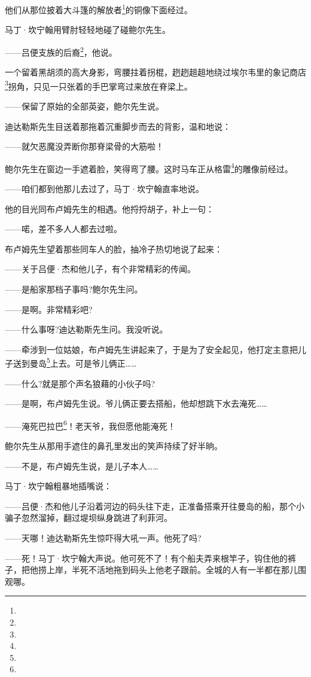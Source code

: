 \par 他们从那位披着大斗篷的解放者\footnote{}的铜像下面经过。
\par 马丁·坎宁翰用臂肘轻轻地碰了碰鲍尔先生。
\par ——吕便支族的后裔\footnote{}，他说。
\par 一个留着黑胡须的高大身影，弯腰拄着拐棍，趔趔趄趄地绕过埃尔韦里的象记商店\footnote{}拐角，只见一只张着的手巴掌弯过来放在脊梁上。
\par ——保留了原始的全部英姿，鲍尔先生说。
\par 迪达勒斯先生目送着那拖着沉重脚步而去的背影，温和地说：
\par ——就欠恶魔没弄断你那脊梁骨的大筋啦！
\par 鲍尔先生在窗边一手遮着脸，笑得弯了腰。这时马车正从格雷\footnote{}的雕像前经过。
\par ——咱们都到他那儿去过了，马丁·坎宁翰直率地说。
\par 他的目光同布卢姆先生的相遇。他捋捋胡子，补上一句：
\par ——喏，差不多人人都去过啦。
\par 布卢姆先生望着那些同车人的脸，抽冷子热切地说了起来：
\par ——关于吕便·杰和他儿子，有个非常精彩的传闻。
\par ——是船家那档子事吗?鲍尔先生问。
\par ——是啊。非常精彩吧?
\par ——什么事呀?迪达勒斯先生问。我没听说。
\par ——牵涉到一位姑娘，布卢姆先生讲起来了，于是为了安全起见，他打定主意把儿子送到曼岛\footnote{}上去。可是爷儿俩正……
\par ——什么?就是那个声名狼藉的小伙子吗?
\par ——是啊，布卢姆先生说。爷儿俩正要去搭船，他却想跳下水去淹死……
\par ——淹死巴拉巴\footnote{}！老天爷，我但愿他能淹死！
\par 鲍尔先生从那用手遮住的鼻孔里发出的笑声持续了好半晌。
\par ——不是，布卢姆先生说，是儿子本人……
\par 马丁·坎宁翰粗暴地插嘴说：
\par ——吕便·杰和他儿子沿着河边的码头往下走，正准备搭乘开往曼岛的船，那个小骗子忽然溜掉，翻过堤坝纵身跳进了利菲河。
\par ——天哪！迪达勒斯先生惊吓得大吼一声。他死了吗?
\par ——死！马丁·坎宁翰大声说。他可死不了！有个船夫弄来根竿子，钩住他的裤子，把他捞上岸，半死不活地拖到码头上他老子跟前。全城的人有一半都在那儿围观哪。
